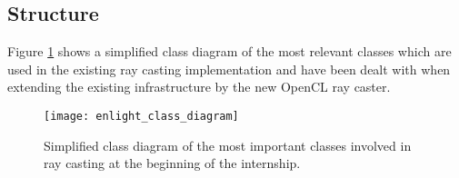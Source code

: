 \subsection{Structure}

Figure \ref{fig:enlight_class_diagram} shows a simplified class diagram of the most relevant classes which are used in the existing ray casting implementation and have been dealt with when extending the existing infrastructure by the new OpenCL ray caster.

\begin{figure}
\centering
\texttt{[image: enlight\_class\_diagram]}
\caption{Simplified class diagram of the most important classes involved in ray casting at the beginning of the internship.}
\label{fig:enlight_class_diagram}
\end{figure}

